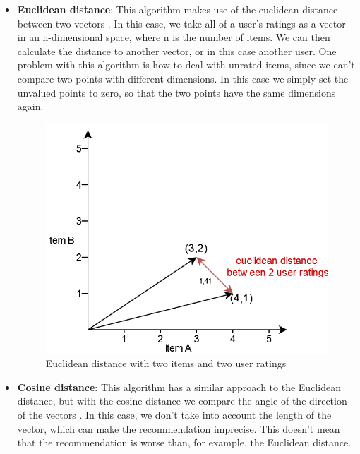 \begin{itemize}
    \item  \textbf{Euclidean distance}: This algorithm makes use of the euclidean distance between two vectors \cite{miningOfMassiveDatasets}. In this case, we take all of a user's ratings as a vector in an n-dimensional space, where n is the number of items. We can then calculate the distance to another vector, or in this case another user. One problem with this algorithm is how to deal with unrated items, since we can't compare two points with different dimensions. In this case we simply set the unvalued points to zero, so that the two points have the same dimensions again.

    \newpage

    \begin{figure}[h!]
    \centering
    \includegraphics[width=\textwidth/2]{images/recommend/euclidian_distance_vis.drawio.png}
    \caption{\label{fig:recommend_euclid}Euclidean distance with two items and two user ratings}
    \end{figure}

    \item \textbf{Cosine distance}: This algorithm has a similar approach to the Euclidean distance, but with the cosine distance we compare the angle of the direction of the vectors \cite{miningOfMassiveDatasets}. In this case, we don't take into account the length of the vector, which can make the recommendation imprecise. This doesn't mean that the recommendation is worse than, for example, the Euclidean distance.


\end{itemize}
